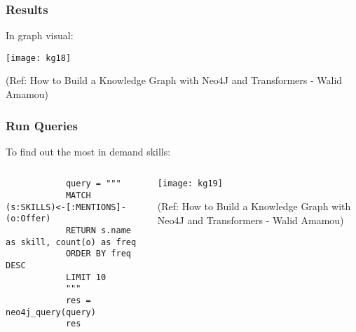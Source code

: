 \begin{frame}[fragile]\frametitle{Results}

In graph visual:

			\begin{center}
			\texttt{[image: kg18]}
			\end{center}	
			
			{\tiny (Ref: How to Build a Knowledge Graph with Neo4J and Transformers - Walid Amamou)}	
			
\end{frame}

\begin{frame}[fragile]\frametitle{Run Queries}

To find out the most in demand skills:

\begin{columns}
    \begin{column}[T]{0.6\linewidth}
		
			\begin{lstlisting}
			query = """
			MATCH (s:SKILLS)<-[:MENTIONS]-(o:Offer)
			RETURN s.name as skill, count(o) as freq
			ORDER BY freq DESC
			LIMIT 10
			"""
			res = neo4j_query(query)
			res
			\end{lstlisting}
    \end{column}
    \begin{column}[T]{0.4\linewidth}
			\begin{center}
			\texttt{[image: kg19]}
			\end{center}	
			
			{\tiny (Ref: How to Build a Knowledge Graph with Neo4J and Transformers - Walid Amamou)}	
    \end{column}			
\end{columns}
			
\end{frame}

